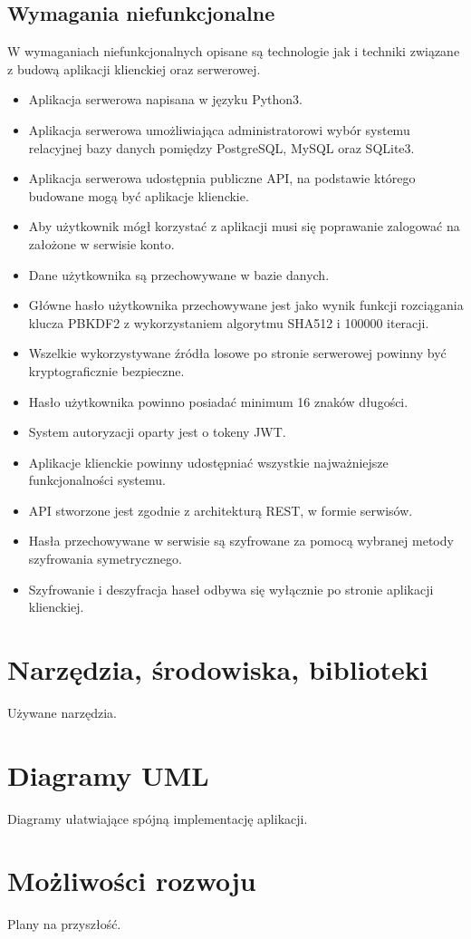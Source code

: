 \documentclass{article}
\begin{document}
    \subsection{Wymagania niefunkcjonalne}
    W wymaganiach niefunkcjonalnych opisane są technologie jak i techniki związane z budową aplikacji klienckiej oraz serwerowej.
	\begin{itemize}
		\item Aplikacja serwerowa napisana w języku Python3.
		\item Aplikacja serwerowa umożliwiająca administratorowi wybór systemu relacyjnej bazy danych pomiędzy PostgreSQL, MySQL oraz SQLite3.
		\item Aplikacja serwerowa udostępnia publiczne API, na podstawie którego budowane mogą być aplikacje klienckie.
		\item Aby użytkownik mógł korzystać z aplikacji musi się poprawanie zalogować na założone w serwisie konto.
		\item Dane użytkownika są przechowywane w bazie danych.
		\item Główne hasło użytkownika przechowywane jest jako wynik funkcji rozciągania klucza PBKDF2 z wykorzystaniem algorytmu SHA512 i 100000 iteracji.
		\item Wszelkie wykorzystywane źródła losowe po stronie serwerowej powinny być kryptograficznie bezpieczne.
		\item Hasło użytkownika powinno posiadać minimum 16 znaków długości.
		\item System autoryzacji oparty jest o tokeny JWT.
		\item Aplikacje klienckie powinny udostępniać wszystkie najważniejsze funkcjonalności systemu.
		\item API stworzone jest zgodnie z architekturą REST, w formie serwisów.
		\item Hasła przechowywane w serwisie są szyfrowane za pomocą wybranej metody szyfrowania symetrycznego.
		\item Szyfrowanie i deszyfracja haseł odbywa się wyłącznie po stronie aplikacji klienckiej.
	\end{itemize}

    \section{Narzędzia, środowiska, biblioteki}
    Używane narzędzia.

    \section{Diagramy UML}
    Diagramy ułatwiające spójną implementację aplikacji.

    \section{Możliwości rozwoju}
    Plany na przyszłość.
\end{document}
